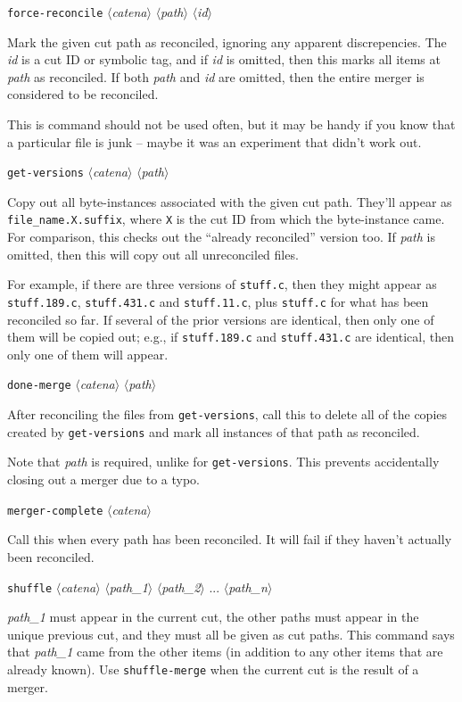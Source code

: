 \documentclass[10pt]{article}
\newcommand{\itarg}[1]{\textit{$\langle$#1$\rangle$}}
\begin{document}
{{\tt force-reconcile} \itarg{catena} \itarg{path} \itarg{id}
\begin{hang}
Mark the given cut path as reconciled, ignoring any apparent
discrepencies. The {\it id} is a cut ID or symbolic tag, and if 
{\it id} is omitted, then this marks all items at {\it path} as 
reconciled. If both {\it path} and {\it id} are omitted, then the
entire merger is considered to be reconciled.

This is command should not be used often, but it may be handy
if you know that a particular file is junk -- maybe it was an 
experiment that didn't work out. 
\end{hang}

{\tt get-versions} \itarg{catena} \itarg{path}
\begin{hang}
Copy out all byte-instances associated with the given cut
path. They'll appear as {\tt file\_name.X.suffix}, where {\tt X} is 
the cut ID from which the byte-instance came. For comparison, this
checks out the ``already reconciled'' version too. If {\it path} is
omitted, then this will copy out all unreconciled files. 

For example, if there are three versions of {\tt stuff.c}, then they
might appear as {\tt stuff.189.c}, {\tt stuff.431.c} and {\tt stuff.11.c},
plus {\tt stuff.c} for what has been reconciled so far. If several of
the prior versions are identical, then only one of them will be copied
out; e.g., if {\tt stuff.189.c} and {\tt stuff.431.c} are identical,
then only one of them will appear.
\end{hang}

{\tt done-merge} \itarg{catena} \itarg{path}
\begin{hang}
After reconciling the files from {\tt get-versions}, call this to
delete all of the copies created by {\tt get-versions} and mark all
instances of that path as reconciled.

Note that {\it path} is required, unlike for {\tt get-versions}. This
prevents accidentally closing out a merger due to a typo.
\end{hang}
\pagebreak
{\tt merger-complete} \itarg{catena}
\begin{hang}
Call this when every path has been reconciled. It will fail if they
haven't actually been reconciled.
\end{hang}

{\tt shuffle} \itarg{catena} \itarg{path\_1} \itarg{path\_2} ... \itarg{path\_n}
\begin{hang}
{\it path\_1} must appear in the current cut, the other paths
must appear in the unique previous cut, and they must all be given as cut
paths. This command says that {\it path\_1} came from the other items
(in addition to any other items that are already known).
Use {\tt shuffle-merge} when the current cut
is the result of a merger.
\end{hang}

}
\end{document}
